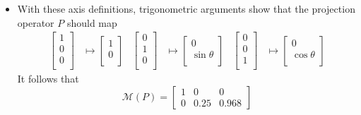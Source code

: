 \documentclass[../notes.tex]{subfiles}
\begin{document}
\begin{itemize}
\begin{itemize}
\begin{itemize}
            \item With these axis definitions, trigonometric arguments show that the projection operator $P$ should map
            \begin{align*}
                \begin{bmatrix}
                    1\\
                    0\\
                    0\\
                \end{bmatrix}
                &\mapsto
                \begin{bmatrix}
                    1\\
                    0\\
                \end{bmatrix}&
                \begin{bmatrix}
                    0\\
                    1\\
                    0\\
                \end{bmatrix}
                &\mapsto
                \begin{bmatrix}
                    0\\
                    \sin\theta\\
                \end{bmatrix}&
                \begin{bmatrix}
                    0\\
                    0\\
                    1\\
                \end{bmatrix}
                &\mapsto
                \begin{bmatrix}
                    0\\
                    \cos\theta\\
                \end{bmatrix}
            \end{align*}
            It follows that
            \begin{equation*}
                \mathcal{M}(P) =
                \begin{bmatrix}
                    1 & 0 & 0\\
                    0 & 0.25 & 0.968
                \end{bmatrix}
            \end{equation*}

\end{itemize}
\end{itemize}
\end{itemize}
\end{document}
